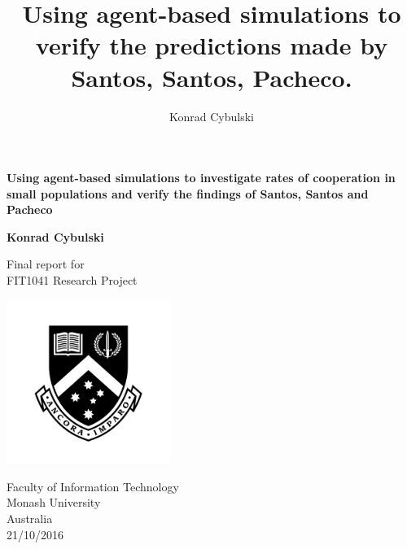 \documentclass[10pt,a4paper]{article}
\author{Konrad Cybulski}
\title{Using agent-based simulations to verify the predictions made by Santos, Santos, Pacheco.}
\begin{document}
\begin{titlepage}
    \begin{center}
        \vspace*{1cm}
        
        \LARGE
        \textbf{Using agent-based simulations to investigate rates of cooperation in small populations and verify the findings of Santos, Santos and Pacheco}
        
        \vspace{2cm}
        \Large
        
        \textbf{Konrad Cybulski}
        
        \vfill
        
        Final report for\\
        FIT1041 Research Project
        
        \vspace{0.8cm}
        
        \includegraphics[width=0.4\textwidth]{Images/monash_emblem.jpg}
        
        \large
        Faculty of Information Technology\\
        Monash University\\
        Australia\\
        21/10/2016
        
    \end{center}
\end{titlepage}

\begin{Large}

\end{Large}

\pagebreak
\tableofcontents
\pagebreak
\end{document}

